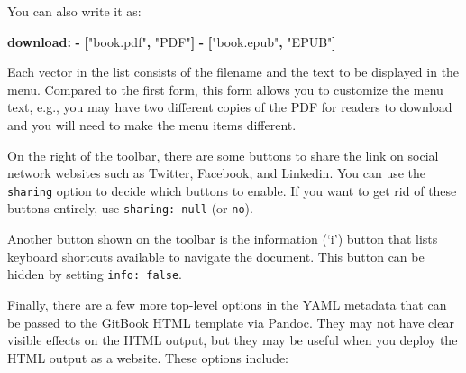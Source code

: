 \documentclass[
  12pt,
]{krantz}
\newenvironment{Shaded}{\begin{snugshade}}{\end{snugshade}}
\newcommand{\AttributeTok}[1]{\textcolor[rgb]{0.13,0.29,0.53}{#1}}
\newcommand{\FunctionTok}[1]{\textcolor[rgb]{0.13,0.29,0.53}{\textbf{#1}}}
\newcommand{\KeywordTok}[1]{\textcolor[rgb]{0.13,0.29,0.53}{\textbf{#1}}}
\newcommand{\StringTok}[1]{\textcolor[rgb]{0.31,0.60,0.02}{#1}}
\theoremstyle{definition}
\theoremstyle{definition}
\theoremstyle{definition}
\theoremstyle{definition}
\theoremstyle{remark}
\begin{document}
You can also write it as:

\begin{Shaded}
\begin{Highlighting}[]
\AttributeTok{    }\FunctionTok{download}\KeywordTok{:}
\AttributeTok{      }\KeywordTok{{-}}\AttributeTok{ }\KeywordTok{[}\StringTok{"book.pdf"}\KeywordTok{,}\AttributeTok{ }\StringTok{"PDF"}\KeywordTok{]}
\AttributeTok{      }\KeywordTok{{-}}\AttributeTok{ }\KeywordTok{[}\StringTok{"book.epub"}\KeywordTok{,}\AttributeTok{ }\StringTok{"EPUB"}\KeywordTok{]}
\end{Highlighting}
\end{Shaded}

Each vector in the list consists of the filename and the text to be displayed in the menu. Compared to the first form, this form allows you to customize the menu text, e.g., you may have two different copies of the PDF for readers to download and you will need to make the menu items different.

On the right of the toolbar, there are some buttons to share the link on social network websites such as Twitter, Facebook, and Linkedin. You can use the \texttt{sharing} option to decide which buttons to enable. If you want to get rid of these buttons entirely, use \texttt{sharing:\ null} (or \texttt{no}).

Another button shown on the toolbar is the information (`i') button that lists keyboard shortcuts available to navigate the document. This button can be hidden by setting \texttt{info:\ false}.

Finally, there are a few more top-level options in the YAML metadata that can be passed to the GitBook HTML template via Pandoc. They may not have clear visible effects on the HTML output, but they may be useful when you deploy the HTML output as a website. These options include:
\end{document}
